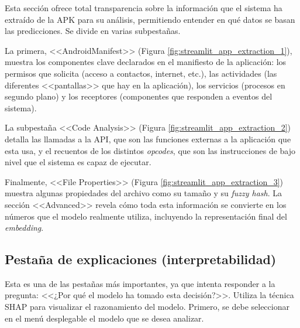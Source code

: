 Esta sección ofrece total transparencia sobre la información que el sistema ha extraído de la APK para su análisis, permitiendo entender en qué datos se basan las predicciones. Se divide en varias subpestañas.

La primera, <<AndroidManifest>> (Figura \ref{fig:streamlit_app_extraction_1}), muestra los componentes clave declarados en el manifiesto de la aplicación: los permisos que solicita (acceso a contactos, internet, etc.), las actividades (las diferentes <<pantallas>> que hay en la aplicación), los servicios (procesos en segundo plano) y los receptores (componentes que responden a eventos del sistema).


La subpestaña <<Code Analysis>> (Figura \ref{fig:streamlit_app_extraction_2}) detalla las llamadas a la API, que son las funciones externas a la aplicación que esta usa, y el recuentos de los distintos \textit{opcodes}, que son las instrucciones de bajo nivel que el sistema es capaz de ejecutar.


Finalmente, <<File Properties>> (Figura \ref{fig:streamlit_app_extraction_3}) muestra algunas propiedades del archivo como su tamaño y su \textit{fuzzy hash}. La sección <<Advanced>> revela cómo toda esta información se convierte en los números que el modelo realmente utiliza, incluyendo la representación final del \textit{embedding}.


\newpage
\subsection{Pestaña de explicaciones (interpretabilidad)}
Esta es una de las pestañas más importantes, ya que intenta responder a la pregunta: <<¿Por qué el modelo ha tomado esta decisión?>>. Utiliza la técnica SHAP para visualizar el razonamiento del modelo. Primero, se debe seleccionar en el menú desplegable el modelo que se desea analizar.


